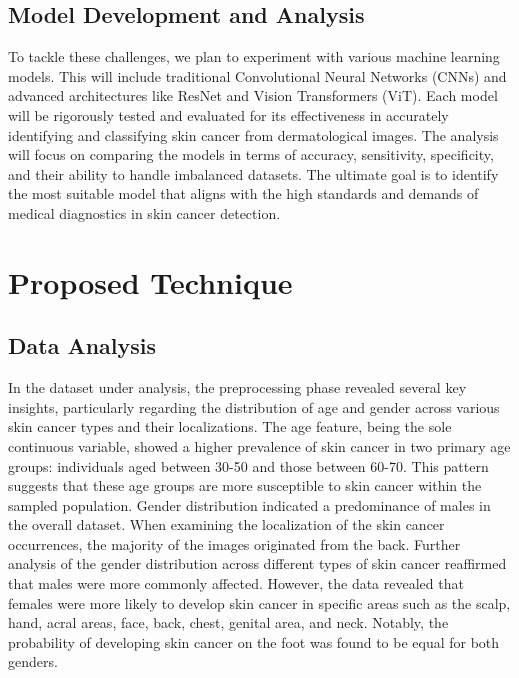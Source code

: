 \documentclass[conference]{IEEEtran}
\begin{document}
\subsection{Model Development and Analysis}
To tackle these challenges, we plan to experiment with various machine learning models. This will include traditional Convolutional Neural Networks (CNNs) and advanced architectures like ResNet and Vision Transformers (ViT). Each model will be rigorously tested and evaluated for its effectiveness in accurately identifying and classifying skin cancer from dermatological images. The analysis will focus on comparing the models in terms of accuracy, sensitivity, specificity, and their ability to handle imbalanced datasets. The ultimate goal is to identify the most suitable model that aligns with the high standards and demands of medical diagnostics in skin cancer detection.



\section{Proposed Technique}
\subsection{Data Analysis}
In the dataset under analysis, the preprocessing phase revealed several key insights, particularly regarding the distribution of age and gender across various skin cancer types and their localizations. The age feature, being the sole continuous variable, showed a higher prevalence of skin cancer in two primary age groups: individuals aged between 30-50 and those between 60-70. This pattern suggests that these age groups are more susceptible to skin cancer within the sampled population. Gender distribution indicated a predominance of males in the overall dataset. When examining the localization of the skin cancer occurrences, the majority of the images originated from the back. Further analysis of the gender distribution across different types of skin cancer reaffirmed that males were more commonly affected. However, the data revealed that females were more likely to develop skin cancer in specific areas such as the scalp, hand, acral areas, face, back, chest, genital area, and neck. Notably, the probability of developing skin cancer on the foot was found to be equal for both genders.
\end{document}
